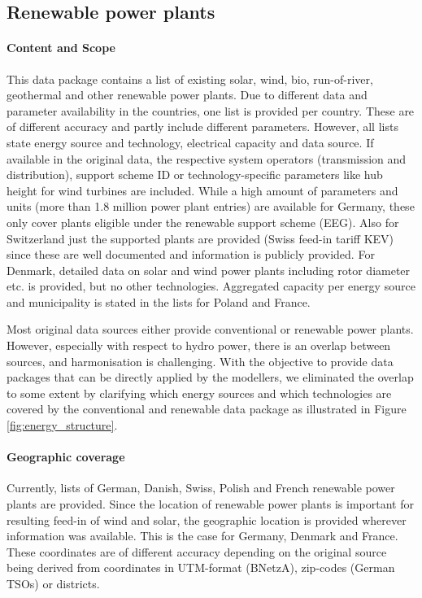 \documentclass[article,sort&compress]{elsarticle}
\begin{document}
\subsection{Renewable power plants}
\paragraph{Content and Scope}
This data package contains a list of existing solar, wind, bio, run-of-river, geothermal and other renewable power plants. Due to different data and parameter availability in the countries, one list is provided per country. These are of different accuracy and partly include different parameters. However, all lists state energy source and technology, electrical capacity and data source. If available in the original data, the respective system operators (transmission and distribution), support scheme ID or technology-specific parameters like hub height for wind turbines are included. While a high amount of parameters and units (more than 1.8 million power plant entries) are available for Germany, these only cover plants eligible under the renewable support scheme (EEG). Also for Switzerland just the supported plants are provided (Swiss feed-in tariff KEV) since these are well documented and information is publicly provided. For Denmark, detailed data on solar and wind power plants including rotor diameter etc. is provided, but no other technologies. Aggregated capacity per energy source and municipality is stated in the lists for Poland and France.

Most original data sources either provide conventional or renewable power plants. However, especially with respect to hydro power, there is an overlap between sources, and harmonisation is challenging. With the objective to provide data packages that can be directly applied by the modellers, we eliminated the overlap to some extent by clarifying which energy sources and which technologies are covered by the conventional and renewable data package as illustrated in Figure \ref{fig:energy_structure}.

\paragraph{Geographic coverage} Currently, lists of German, Danish, Swiss, Polish and French renewable power plants are provided. Since the location of renewable power plants is important for resulting feed-in of wind and solar, the geographic location is provided wherever information was available. This is the case for Germany, Denmark and France. These coordinates are of different accuracy depending on the original source being derived from coordinates in UTM-format (BNetzA), zip-codes (German TSOs) or districts.
\end{document}
